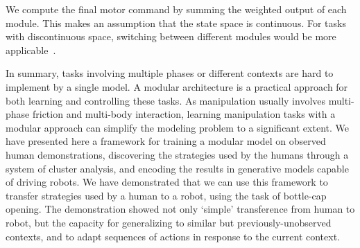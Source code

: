 We compute the final motor command by summing the weighted output of
each module. This makes an assumption that the state space is
continuous. For tasks with discontinuous space, switching between different modules would be more applicable~\citep{narendra1995adaptation,nakanishi2013spatio}.



In summary, tasks involving multiple phases or different contexts are
hard to implement by a single model. A modular architecture is a
practical approach for both learning and controlling these tasks. As
manipulation usually involves multi-phase friction and multi-body
interaction, learning manipulation tasks with a modular approach can
simplify the modeling problem to a significant extent. We have
presented here a framework for training a modular model on observed
human demonstrations, discovering the strategies used by the humans
through a system of cluster analysis, and encoding
the results in generative models capable of driving robots. We have
demonstrated that we can use this framework to transfer strategies
used by a human to a robot, using the task of bottle-cap
opening. The demonstration showed not only `simple' transference from
human to robot, but the capacity for generalizing to similar but
previously-unobserved contexts, and to adapt sequences of actions in
response to the current context.


